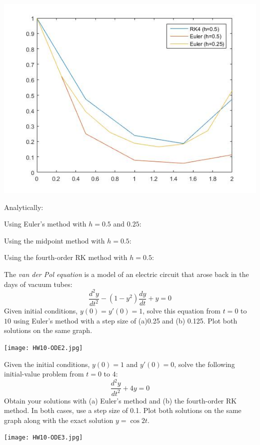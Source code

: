 \documentclass{article}
\begin{document}
\includegraphics[width=\linewidth]{HW10-ODE1.jpg}

\begin{solution}
Analytically:
\end{solution}

\begin{solution}
Using Euler's method with $h=0.5$ and $0.25$:
\end{solution}

\begin{solution}
Using the midpoint method with $h=0.5$:
\end{solution}

\begin{solution}
Using the fourth-order RK method with $h=0.5$:
\end{solution}

\setcounter{problem}{7}
\begin{problem}
The \textit{van der Pol equation} is a model of an electric circuit that arose back in the days of vacuum tubes:
\[ \frac{d^{2}y}{dt^{2}} -(1-y^{2})\frac{dy}{dt} +y = 0 \]
Given initial conditions, $y(0)=y'(0)=1$, solve this equation from $t=0$ to $10$ using Euler's method with a step size of (a)0.25 and (b) 0.125. Plot both solutions on the same graph.
\end{problem}

\texttt{[image: HW10-ODE2.jpg]}

\begin{problem}
Given the initial conditions, $y(0)=1$ and $y'(0)=0$, solve the following initial-value problem from $t=0$ to $4$:
\[ \frac{d^{2}y}{dt^{2}} +4y = 0 \]
Obtain your solutions with (a) Euler's method and (b) the fourth-order RK method. In both cases, use a step size of 0.1. Plot both solutions on the same graph along with the exact solution $y=\cos 2t$.
\end{problem}

\texttt{[image: HW10-ODE3.jpg]}
\end{document}
